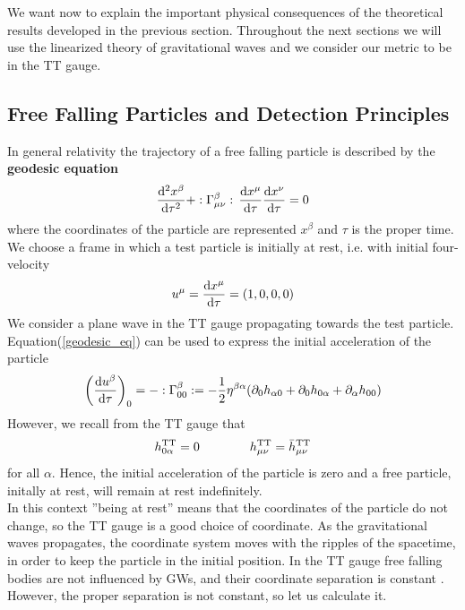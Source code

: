 We want now to explain the important physical consequences of the theoretical results developed in the previous section.
Throughout the next sections we will use the linearized theory of gravitational waves and we consider our metric to be in the TT gauge.
\subsection{Free Falling Particles and Detection Principles}
\label{free_particles_detection_principles}
In general relativity the trajectory of a free falling particle is described by the \textbf{geodesic equation}
\begin{equation}
\label{geodesic_eq}
\dv[2]{x^{\beta}}{\tau} + :\Gamma^{\beta} _{\mu \nu}: \,\dv{x^{\mu}}{\tau} \dv{x^{\nu}}{\tau} = 0
\end{equation}
where the coordinates of the particle are represented $x^{\beta}$ and $\tau$ is the proper time.\\
We choose a frame in which a test particle is initially at rest, i.e. with initial four-velocity
\[
u^{\mu} = \dv{x^{\mu}}{\tau} = (1,0,0,0)
\]
We consider a plane wave in the TT gauge propagating towards the test particle. \\
Equation(\ref{geodesic_eq}) can be used to express the initial acceleration of the particle
\begin{equation}
\label{christoffel_symbol_geodesic}
\qty(
\dv{u^{\beta}}{\tau} 
)_{0}
=
- :\Gamma^{\beta} _{0 0}: 
= -\dfrac{1}{2} \eta ^{\beta \alpha}
\qty(
\partial_{0} h_{\alpha 0} + 
\partial_{0} h_{0 \alpha} + 
\partial_{\alpha} h_{0 0}
)
\end{equation}
However, we recall from the TT gauge that
\[
h^{\text{TT}}_{0 \alpha} = 0 \qquad  \qquad h^{\text{TT}}_{\mu \nu} = \bar{h}^{\text{TT}}_{\mu \nu} 
\]
for all $\alpha$. Hence, the initial acceleration of the particle is zero and a free particle, initally at rest, will remain at rest indefinitely.\\
In this context ''being at rest'' means that the coordinates of the particle do not change, so the TT gauge is a good choice of coordinate. As the gravitational waves propagates, the coordinate system moves with the ripples of the spacetime, in order to keep the particle in the initial position.
In the TT gauge free falling bodies are not influenced by  GWs, and their coordinate separation is constant \cite{martin_notes}.\\
However, the proper separation is not constant, so let us calculate it.\\
